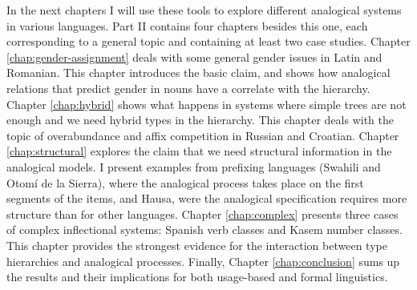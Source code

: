 In the next chapters I will use these tools to explore different analogical systems in various languages. Part II contains four chapters besides this one, each corresponding to a general topic and containing at least two case studies. Chapter \ref{chap:gender-assignment} deals with some general gender issues in Latin and Romanian. This chapter introduces the basic claim, and shows how analogical relations that predict gender in nouns have a correlate with the hierarchy. Chapter \ref{chap:hybrid} shows what happens in systems where simple trees are not enough and we need hybrid types in the hierarchy. This chapter deals with the topic of overabundance and affix competition in Russian and Croatian. Chapter \ref{chap:structural} explores the claim that we need structural information in the analogical models. I present examples from prefixing languages (Swahili and Otomí de la Sierra), where the analogical process takes place on the first segments of the items, and Hausa, were the analogical specification requires more structure than for other languages. Chapter \ref{chap:complex} presents three cases of complex inflectional systems: Spanish verb classes and Kasem number classes. This chapter provides the strongest evidence for the interaction between type hierarchies and analogical processes. Finally, Chapter \ref{chap:conclusion} sums up the results and their implications for both usage-based and formal linguistics.


